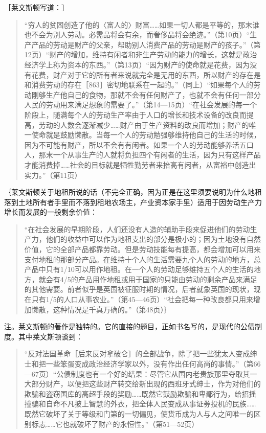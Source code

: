 ［莱文斯顿写道：］

\begin{quote}{“穷人的贫困创造了他的〈富人的〉财富……如果一切人都是平等的，那末谁也不会为别人劳动。必需品将会有余，而奢侈品将会绝迹。”（第10页）“生产产品的劳动是财产的父亲，帮助别人消费产品的劳动是财产的孩子。”（第12页）“财产的增加，维持有闲者和非生产劳动的能力的增长，这就是政治经济学上称为资本的东西。”（第13页）“因为财产的使命就是花费，因为没有花费，财产对于它的所有者来说就完全是无用的东西，所以财产的存在是和消费劳动的存在［863］密切地联系在一起的。”（同上）“如果每个人的劳动刚够生产他自己的食物，那就不会有任何财产了，也就不会有任何一部分人民的劳动用来满足想象的需要了。”（第14—15页）“在社会发展的每一个阶段上，随满每个人的劳动生产率由于人口的增长和技术设备的改良而提高，劳动的人数会逐渐减少……财产由于生产资料的改良而增加；财产的唯一使命就是鼓励懒散。当每一个人的劳动勉强够维持他自己的生活的时候，因为不可能有财产，所以不会有有闲者。如果一个人的劳动能够养活五口人，那末一个从事生产的人就将负担四个有闲者的生活，因为只有这样产品才能消费掉……社会的目标就是牺牲勤劳者来抬高有闲者，从富裕中创造出实力。”（第11页）}\end{quote}

｛莱文斯顿关于地租所说的话（不完全正确，因为正是在这里须要说明为什么地租落到土地所有者手里而不落到租地农场主，产业资本家手里）适用于因劳动生产力增长而发展的一般剩余价值：

\begin{quote}{“在社会发展的早期阶段，人们还没有人造的辅助手段来促进他们的劳动生产力，他们的收益中可以作为地租支出的部分是极小的；因为土地没有自然价值，它的全部产品都靠劳动。但是劳动技能每有提高，都会增加可以用来支付地租的那部分产品。在维持十个人的生活需要九个人的劳动的地方，总产品中只有1/10可以用作地租。在一个人的劳动足够维持五个人的生活的地方，就会有4/5的产品用作地租或用于国家的只能由劳动的剩余产品来满足的其他需要。前者似乎是英国被征服时期的情况，后者就象英国的现状，现在只有1/5的人口从事农业。”（第45—46页）“社会把每一种改良都只用来增加懒散，这种情况是千真万确的。”（第48页）｝}\end{quote}

注。莱文斯顿的著作是独特的。它的直接的题目，正如书名写的，是现代的公债制度。其中莱文斯顿谈到：

\begin{quote}{“反对法国革命［后来反对拿破仑］的全部战争，除了把一些犹太人变成绅士和把一些笨蛋变成政治经济学家以外，没有作出任何高尚的事情。”（第66—67页）“公债制度也有一个好的结果：尽管它从国内老贵族那里夺取其一大部分财产，以便把这些财产转交给新出现的西班牙式绅士，作为对他们的欺骗和盗窃国库的高超手段的奖励……既然它鼓励欺骗和卑鄙行为，给招摇撞骗和自命不凡披上智慧的外衣，把全体人民变成从事证券投机的民族……既然它破坏了关于等级和门第的一切偏见，使货币成为人与人之间唯一的区别标志……它也就破坏了财产的永恒性。”（第51—52页）}\end{quote}

